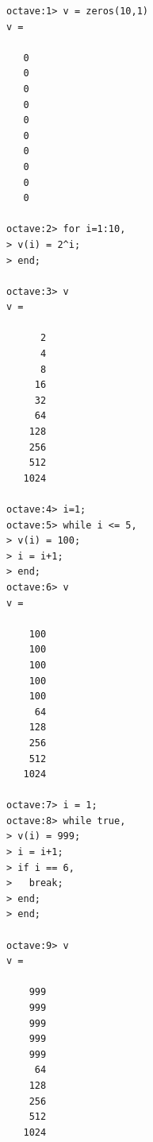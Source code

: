 \documentclass[12pt]{report}
\begin{document}
\begin{lstlisting}[basicstyle=\small]
octave:1> v = zeros(10,1)
v =

   0
   0
   0
   0
   0
   0
   0
   0
   0
   0

octave:2> for i=1:10,
> v(i) = 2^i;
> end;

octave:3> v
v =

      2
      4
      8
     16
     32
     64
    128
    256
    512
   1024

octave:4> i=1;
octave:5> while i <= 5,
> v(i) = 100;
> i = i+1;
> end;
octave:6> v
v =

    100
    100
    100
    100
    100
     64
    128
    256
    512
   1024

octave:7> i = 1;
octave:8> while true,
> v(i) = 999;
> i = i+1;
> if i == 6,
>   break;
> end;
> end;

octave:9> v
v =

    999
    999
    999
    999
    999
     64
    128
    256
    512
   1024

\end{lstlisting}
\end{document}
